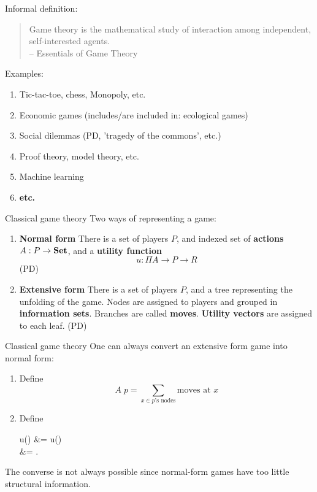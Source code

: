 \begin{frame}
	Informal definition:

	\vfill
	\begin{quotation}
		Game theory is the mathematical study of interaction among independent, self-interested agents.\\
		{\color{colornote}-- Essentials of Game Theory \cite{eogt}}
	\end{quotation}

	\vfill
	Examples:
	\begin{enumerate}
		\item Tic-tac-toe, chess, Monopoly, etc.
		\item Economic games (includes/are included in: ecological games)
		\item Social dilemmas (PD, 'tragedy of the commons', etc.)
		\item Proof theory, model theory, etc.
		\item Machine learning
		\item \textbf{etc.}
	\end{enumerate}
\end{frame}

\begin{frame}{Classical game theory}
	Two ways of representing a game:

	\vfill
	\begin{enumerate}
		\item \textbf{Normal form}
		There is a set of players $P$, and indexed set of \textbf{actions} $A : P \to \mathbf{Set}$, and a \textbf{utility function}
		\begin{equation*}
			u : \Pi A \to P \to R
		\end{equation*}
		(PD)
		\item \textbf{Extensive form}
		There is a set of players $P$, and a tree representing the unfolding of the game. Nodes are assigned to players and grouped in \textbf{information sets}. Branches are called \textbf{moves}. \textbf{Utility vectors} are assigned to each leaf.
		(PD)
	\end{enumerate}
\end{frame}

\begin{frame}{Classical game theory}
	One can always convert an extensive form game into normal form:

	\hfill
	\begin{enumerate}
		\item Define
		\begin{equation*}
			A\; p = \sum_{x \in \text{$p$'s nodes}} \text{moves at $x$}
		\end{equation*}
		\item Define
		\begin{eqalign*}
			u() &=
			u()\\
			&= .
		\end{eqalign*}
	\end{enumerate}
	The converse is not always possible since normal-form games have too little structural information.
\end{frame}

